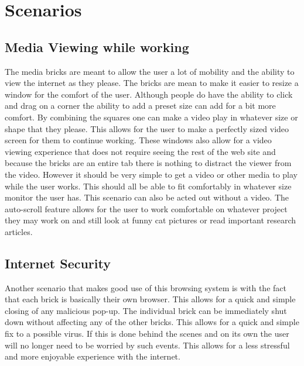 \documentclass[11pt]{article}
\begin{document}
\section{Scenarios}

\subsection{Media Viewing while working}
The media bricks are meant to allow the user a lot of mobility and the ability to view the internet as they please. The bricks are mean to make it easier to resize a window for the comfort of the user. Although people do have the ability to click and drag on a corner the ability to add a preset size can add for a bit more comfort. By combining the squares one can make a video play in whatever size or shape that they please. This allows for the user to make a perfectly sized video screen for them to continue working. These windows also allow for a video viewing experience that does not require seeing the rest of the web site and because the bricks are an entire tab there is nothing to distract the viewer from the video. However it should be very simple to get a video or other media to play while the user works. This should all be able to fit comfortably in whatever size monitor the user has. This scenario can also be acted out without a video. The auto-scroll feature allows for the user to work comfortable on whatever project they may work on and still look at funny cat pictures or read important research articles.

\subsection{Internet Security}
Another scenario that makes good use of this browsing system is with the fact that each brick is basically their own browser. This allows for a quick and simple closing of any malicious pop-up. The individual brick can be immediately shut down without affecting any of the other bricks. This allows for a quick and simple fix to a possible virus. If this is done behind the scenes and on its own the user will no longer need to be worried by such events. This allows for a less stressful and more enjoyable experience with the internet.

\subsection{}


\end{document}
